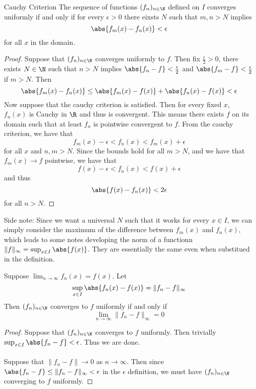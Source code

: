 \begin{thm}{Cauchy Criterion}{} The sequence of functions $(f_n)_{n\in\N}$ defined on $I$ converges uniformly if and only if for every $\epsilon>0$ there eixsts $N$ such that $m,n>N$ implies $$\abs{f_m(x)-f_n(x)}<\epsilon$$ for all $x$ in the domain. \tcbline
\begin{proof}
Suppose that $(f_n)_{n\in\N}$ converges uniformly to $f$. Then fix $\frac{\epsilon}{2}>0$, there exists $N\in\N$ such that $n>N$ implies $\abs{f_n-f}<\frac{\epsilon}{2}$ and $\abs{f_m-f}<\frac{\epsilon}{2}$ if $m>N$. Then $$\abs{f_m(x)-f_n(x)}\leq\abs{f_m(x)-f(x)}+\abs{f_n(x)-f(x)}<\epsilon$$
Now suppose that the cauchy criterion is satisfied. Then for every fixed $x$, $f_n(x)$ is Cauchy in $\R$ and thus is convergent. This means there exists $f$ on its domain such that at least $f_n$ is pointwise convergent to $f$. From the cauchy criterion, we have that $$f_m(x)-\epsilon<f_n(x)<f_m(x)+\epsilon$$ for all $x$ and $n,m>N$. Since the bounds hold for all $m>N$, and we have that $f_m(x)\to f$ pointwise, we have that $$f(x)-\epsilon<f_n(x)<f(x)+\epsilon$$ and thus $$\abs{f(x)-f_n(x)}<2\epsilon$$ for all $n>N$. 
\end{proof}
\end{thm}

Side note: Since we want a universal $N$ such that it works for every $x\in I$, we can simply consider the maximum of the difference between $f_m(x)$ and $f_n(x)$, which leads to some notes developing the norm of a functionn $\|f\|_{\infty}=\sup_{x\in I}\abs{f(x)}$. They are essentially the same even when substitued in the definition. 

\begin{prp}{}{} Suppose $\lim_{n\to\infty}f_n(x)=f(x)$. Let $$\sup_{x\in I}\abs{f_n(x)-f(x)}=\|f_n-f\|_\infty$$ Then $(f_n)_{n\in\N}$ converges to $f$ uniformly if and only if $$\lim_{n\to\infty}\|f_n-f\|_\infty=0$$ \tcbline
\begin{proof}
Suppose that $(f_n)_{n\in\N}$ converges to $f$ uniformly. Then trivially $\sup_{x\in I}\abs{f_n-f}<\epsilon$. Thus we are done. \\~\\
Suppose that $\|f_n-f\|\to 0$ as $n\to\infty$. Then since $\abs{f_n-f}\leq\|f_n-f\|_\infty<\epsilon$ in the $\epsilon$ definition, we must have $(f_n)_{n\in\N}$ converging to $f$ uniformly. 
\end{proof}
\end{prp}

